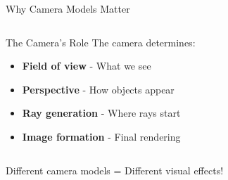 \begin{frame}{Why Camera Models Matter}
    \begin{columns}
        \begin{column}{0.5\textwidth}
            \begin{conceptbox}{The Camera's Role}
                The camera determines:
                \begin{itemize}
                    \item \textbf{Field of view} - What we see
                    \item \textbf{Perspective} - How objects appear
                    \item \textbf{Ray generation} - Where rays start
                    \item \textbf{Image formation} - Final rendering
                \end{itemize}
            \end{conceptbox}
        \end{column}
        \begin{column}{0.5\textwidth}
        \end{column}
    \end{columns}
    
    \vspace{0.5cm}
    \begin{center}
        \alert{Different camera models = Different visual effects!}
    \end{center}
\end{frame}

